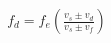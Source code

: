 \documentclass[preview]{standalone}
\begin{document}
\begin{align*}
f_d =f_e \left(\frac{v_s \pm v_d}{v_s \pm  v_f}\right)
\end{align*}
\end{document}
